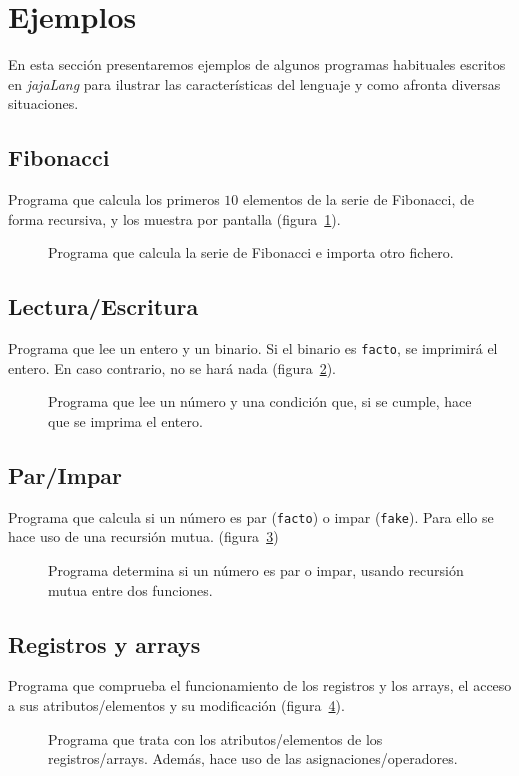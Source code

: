 \section{Ejemplos}
En esta sección presentaremos ejemplos de algunos programas habituales escritos
en \textit{jajaLang} para ilustrar las características del lenguaje y como
afronta diversas situaciones.

\subsection{Fibonacci}
Programa que calcula los primeros $10$ elementos de la serie de Fibonacci, de forma
recursiva, y los muestra por pantalla (figura~\ref{fig:fibo}).
\begin{figure}[htbp]
    \centering
    
    \caption{Programa que calcula la serie de Fibonacci e importa otro fichero.}
    \label{fig:fibo}
\end{figure}

\subsection{Lectura/Escritura}
Programa que lee un entero y un binario. Si el binario es \lstinline{facto}, se
imprimirá el entero. En caso contrario, no se hará nada
(figura~\ref{fig:lecesc}).
\begin{figure}[htbp]
    \centering
    
    \caption{Programa que lee un número y una condición que, si se cumple, hace
    que se imprima el entero.}
    \label{fig:lecesc}
\end{figure}

\subsection{Par/Impar}
Programa que calcula si un número es par (\lstinline{facto}) o impar
(\lstinline{fake}). Para ello se hace uso de una recursión mutua.
(figura~\ref{fig:parimpar})
\begin{figure}[htbp]
    \centering
    
    \caption{Programa determina si un número es par o impar, usando recursión
    mutua entre dos funciones.}
    \label{fig:parimpar}
\end{figure}

\subsection{Registros y arrays}
Programa que comprueba el funcionamiento de los registros y los arrays, el
acceso a sus atributos/elementos y su modificación (figura~\ref{fig:regarray}).
\begin{figure}[htbp]
    \centering
    
    \caption{Programa que trata con los atributos/elementos de los
    registros/arrays. Además, hace uso de las asignaciones/operadores.}
    \label{fig:regarray}
\end{figure}

